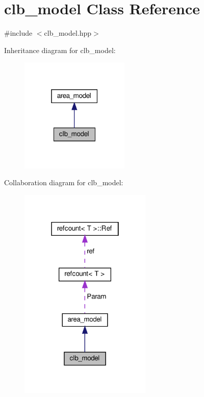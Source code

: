 \hypertarget{classclb__model}{}\section{clb\+\_\+model Class Reference}
\label{classclb__model}


{\ttfamily \#include $<$clb\+\_\+model.\+hpp$>$}



Inheritance diagram for clb\+\_\+model\+:
\nopagebreak
\begin{figure}[H]
\begin{center}
\leavevmode
\includegraphics[width=147pt]{d5/d46/classclb__model__inherit__graph}
\end{center}
\end{figure}


Collaboration diagram for clb\+\_\+model\+:
\nopagebreak
\begin{figure}[H]
\begin{center}
\leavevmode
\includegraphics[width=178pt]{d7/d10/classclb__model__coll__graph}
\end{center}
\end{figure}
